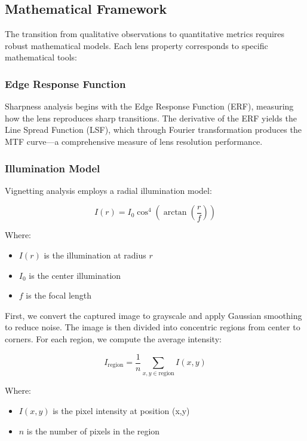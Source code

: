 \subsection{Mathematical Framework}
The transition from qualitative observations to quantitative metrics requires robust mathematical models. Each lens property corresponds to specific mathematical tools:

\subsubsection{Edge Response Function}
Sharpness analysis begins with the Edge Response Function (ERF), measuring how the lens reproduces sharp transitions. The derivative of the ERF yields the Line Spread Function (LSF), which through Fourier transformation produces the MTF curve---a comprehensive measure of lens resolution performance.

\subsubsection{Illumination Model}
Vignetting analysis employs a radial illumination model:

\begin{equation}
I(r) = I_0 \cos^4\left(\arctan\left(\frac{r}{f}\right)\right)
\end{equation}

Where:
\begin{itemize}
    \item \( I(r) \) is the illumination at radius \( r \)
    \item \( I_0 \) is the center illumination
    \item \( f \) is the focal length
\end{itemize}


First, we convert the captured image to grayscale and apply Gaussian smoothing to reduce noise. The image is then divided into concentric regions from center to corners. For each region, we compute the average intensity:

\begin{equation}
I_{\text{region}} = \frac{1}{n} \sum_{x,y \in \text{region}} I(x,y)
\end{equation}

Where:
\begin{itemize}
    \item \( I(x,y) \) is the pixel intensity at position (x,y)
    \item \( n \) is the number of pixels in the region
\end{itemize}

